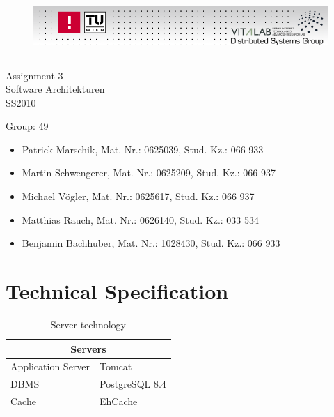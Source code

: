 \documentclass[11pt]{article}
\newcommand{\groupNr}{49}
\newcommand{\assignmentNr}{3}
\begin{document}
{
	\begin{figure}[h]
	\hspace{-1cm}
	\includegraphics[height=23mm, width=170mm]{dsg-logo.png}
	\end{figure}

	\vspace{25mm}
	\centering
	{ \sffamily \Huge Assignment \assignmentNr } \\ \vspace{1mm}
	Software Architekturen \\ SS2010 \\ \vspace{10mm}
}

\noindent Group: \groupNr
\begin{itemize}
\item Patrick Marschik, Mat. Nr.: 0625039, Stud. Kz.: 066 933
\item Martin Schwengerer, Mat. Nr.: 0625209, Stud. Kz.: 066 937
\item Michael V\"ogler, Mat. Nr.: 0625617, Stud. Kz.: 066 937
\item Matthias Rauch, Mat. Nr.: 0626140, Stud. Kz.: 033 534
\item Benjamin Bachhuber, Mat. Nr.: 1028430, Stud. Kz.: 066 933
\end{itemize}

\newpage
\tableofcontents

\newpage

\section{Technical Specification}

\begin{table}[h]
	\begin{tabularx}{\textwidth}{| X | X |}
	\hline
	\multicolumn{2}{|c|}{\textbf{Servers}} \\
	\hline
	\cellcolor[gray]{0.9}
	Application Server & Tomcat\\
	\hline
	\cellcolor[gray]{0.9}
	DBMS & PostgreSQL 8.4\\
	\hline
	\cellcolor[gray]{0.9}
	Cache & EhCache\\
	\hline
	\end{tabularx}
	\caption{Server technology}
	\label{server_tech}
\end{table}
\end{document}
